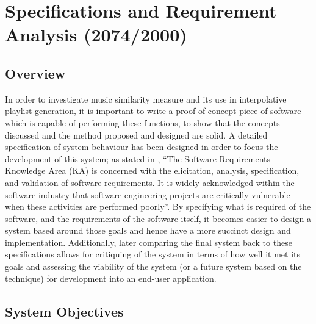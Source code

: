 %
%
\newcommand{\objective}[1]{
	\subsubsection{#1}
}
\chapter{Specifications and Requirement Analysis (2074/2000)}
\section{Overview}
In order to investigate music similarity measure and its use in interpolative playlist generation, it is important to write a proof-of-concept piece of software which is capable of performing these functions, to show that the concepts discussed and the method proposed and designed are solid. A detailed specification of system behaviour has been designed in order to focus the development of this system; as stated in \citet{Bourque2004}, ``The Software Requirements Knowledge Area (KA) is concerned with the elicitation, analysis, specification, and validation of software requirements. It is widely acknowledged within the software industry that software engineering projects are critically vulnerable when these activities are performed poorly''. By specifying what is required of the software, and the requirements of the software itself, it becomes easier to design a system based around those goals and hence have a more succinct design and implementation. Additionally, later comparing the final system back to these specifications allows for critiquing of the system in terms of how well it met its goals and  assessing the viability of the system (or a future system based on the technique) for development into an end-user application.
\section{System Objectives}
